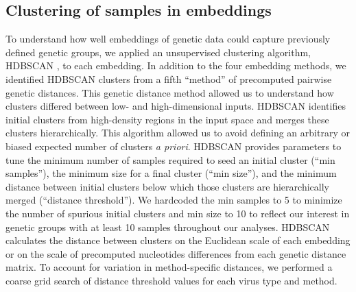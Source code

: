 \documentclass[webpdf,contemporary,large,single]{oup-authoring-template}%
\theoremstyle{thmstyleone}%
\theoremstyle{thmstyletwo}%
\theoremstyle{thmstylethree}%
\begin{document}
\subsection{Clustering of samples in embeddings}

To understand how well embeddings of genetic data could capture previously defined genetic groups, we applied an unsupervised clustering algorithm, HDBSCAN \citep{campello2015hierarchical}, to each embedding.
In addition to the four embedding methods, we identified HDBSCAN clusters from a fifth ``method'' of precomputed pairwise genetic distances.
This genetic distance method allowed us to understand how clusters differed between low- and high-dimensional inputs.
HDBSCAN identifies initial clusters from high-density regions in the input space and merges these clusters hierarchically.
This algorithm allowed us to avoid defining an arbitrary or biased expected number of clusters \emph{a priori}.
HDBSCAN provides parameters to tune the minimum number of samples required to seed an initial cluster (``min samples''), the minimum size for a final cluster (``min size''), and the minimum distance between initial clusters below which those clusters are hierarchically merged (``distance threshold'').
We hardcoded the min samples to 5 to minimize the number of spurious initial clusters and min size to 10 to reflect our interest in genetic groups with at least 10 samples throughout our analyses.
HDBSCAN calculates the distance between clusters on the Euclidean scale of each embedding or on the scale of precomputed nucleotides differences from each genetic distance matrix.
To account for variation in method-specific distances, we performed a coarse grid search of distance threshold values for each virus type and method.
\end{document}
